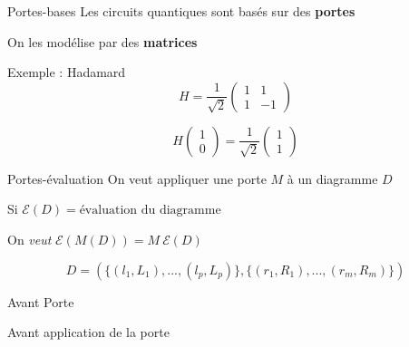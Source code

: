 \begin{frame}[noframenumbering]{Portes-bases}
  Les circuits quantiques sont basés sur des \textbf{portes}

  \vspace{1em}
  On les modélise par des \textbf{matrices}

  \pause

  \vspace{1em}
  Exemple : Hadamard
  $$H = \frac{1}{\sqrt{2}}\begin{pmatrix}
    1 & 1 \\
    1 & -1
  \end{pmatrix}$$

  $$H \begin{pmatrix}
    1 \\ 0
  \end{pmatrix} = \frac{1}{\sqrt{2}} \begin{pmatrix}
     1 \\ 1
  \end{pmatrix}$$
\end{frame}

\begin{frame}{Portes-évaluation}
  On veut appliquer une porte $M$ à un diagramme $D$

  \pause

  \vspace{1em}
  Si $\mathcal E(D) = \text{évaluation du diagramme}$

  \vspace{1em}
  On \textit{veut}
  $\mathcal E(M(D)) = M~\mathcal E(D)$

  \pause

  $$D = (\{(l_1, L_1), ..., (l_p, L_p)\}, \{(r_1,R_1), ..., (r_m, R_m)\})$$
\end{frame}

\begin{frame}{Avant Porte}
  \begin{figure}[ht]
    \centering
  \end{figure}
  \begin{center}
    {Avant application de la porte}
  \end{center}
\end{frame}

